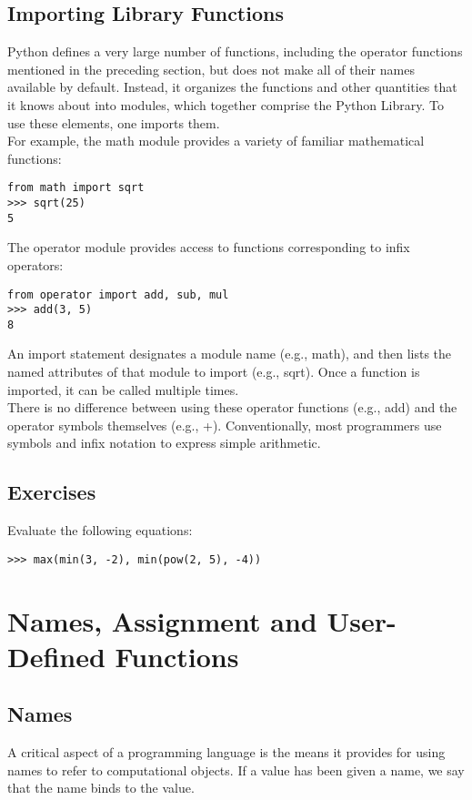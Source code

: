 \documentclass[11pt]{article}
\begin{document}
\subsection{Importing Library Functions}
Python defines a very large number of functions, including the operator functions mentioned in the preceding section, but does not make all of their names available by default. Instead, it organizes the functions and other quantities that it knows about into modules, which together comprise the Python Library. To use these elements, one imports them. \\
For example, the math module provides a variety of familiar mathematical functions:
\begin{lstlisting}
from math import sqrt
>>> sqrt(25) 
5
\end{lstlisting}

The operator module provides access to functions corresponding to infix operators: 

\begin{lstlisting} 
from operator import add, sub, mul
>>> add(3, 5)
8
\end{lstlisting}
An import statement designates a module name (e.g., math), and then lists the named attributes of that module to import (e.g., sqrt). Once a function is imported, it can be called multiple times. \\
There is no difference between using these operator functions (e.g., add) and the operator symbols themselves (e.g., +). Conventionally, most programmers use symbols and infix notation to express simple arithmetic.

\subsection{Exercises} 
Evaluate the following equations: 
\begin{lstlisting}
>>> max(min(3, -2), min(pow(2, 5), -4))
\end{lstlisting}

\newpage
\section{Names, Assignment and User-Defined Functions}
\subsection{Names} 
A critical aspect of a programming language is the means it provides for using names to refer to computational objects. If a value has been given a name, we say that the name binds to the value. 
\end{document}
